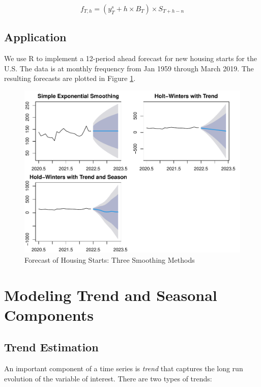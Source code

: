 \documentclass[]{book}
\theoremstyle{definition}
\theoremstyle{definition}
\theoremstyle{definition}
\theoremstyle{remark}
\begin{document}
\begin{equation}
    f_{T,h}= (y_T^s + h\times B_T) \times S_{T+h-n}
   \end{equation}

\hypertarget{application}{%
\section{Application}\label{application}}

We use R to implement a 12-period ahead forecast for new housing starts for the U.S. The data is at monthly frequency from Jan 1959 through March 2019. The resulting forecasts are plotted in Figure \ref{fig:ch4-figure1}.

\begin{figure}

{\centering \includegraphics[width=0.8\linewidth]{bookdown-demo_files/figure-latex/ch4-figure1-1} 

}

\caption{Forecast of Housing Starts: Three Smoothing Methods}\label{fig:ch4-figure1}
\end{figure}

\hypertarget{modeling-trend-and-seasonal-components}{%
\chapter{Modeling Trend and Seasonal Components}\label{modeling-trend-and-seasonal-components}}

\hypertarget{trend-estimation}{%
\section{Trend Estimation}\label{trend-estimation}}

An important component of a time series is \emph{trend} that captures the long run evolution of the variable of interest. There are two types of trends:
\end{document}
